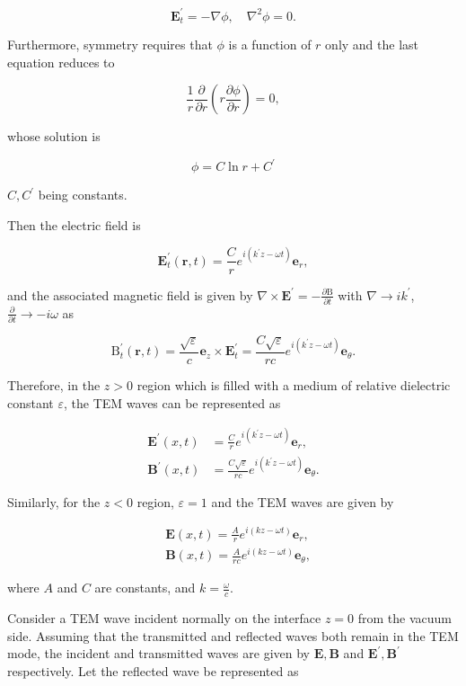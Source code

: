 \documentclass[10pt]{article}
\begin{document}
$$
\mathbf{E}_{t}^{\prime}=-\nabla \phi, \quad \nabla^{2} \phi=0 .
$$

Furthermore, symmetry requires that $\phi$ is a function of $r$ only and the last equation reduces to

$$
\frac{1}{r} \frac{\partial}{\partial r}\left(r \frac{\partial \phi}{\partial r}\right)=0,
$$

whose solution is

$$
\phi=C \ln r+C^{\prime}
$$

$C, C^{\prime}$ being constants.

Then the electric field is

$$
\mathbf{E}_{t}^{\prime}(\mathbf{r}, t)=\frac{C}{r} e^{i\left(k^{\prime} z-\omega t\right)} \mathbf{e}_{r},
$$

and the associated magnetic field is given by $\nabla \times \mathbf{E}^{\prime}=-\frac{\partial \mathrm{B}}{\partial t}$ with $\nabla \rightarrow i k^{\prime}$, $\frac{\partial}{\partial t} \rightarrow-i \omega$ as

$$
\mathrm{B}_{t}^{\prime}(\mathbf{r}, t)=\frac{\sqrt{\varepsilon}}{c} \mathbf{e}_{z} \times \mathbf{E}_{t}^{\prime}=\frac{C \sqrt{\varepsilon}}{r c} e^{i\left(k^{\prime} z-\omega t\right)} \mathbf{e}_{\theta} .
$$

Therefore, in the $z>0$ region which is filled with a medium of relative dielectric constant $\varepsilon$, the TEM waves can be represented as

$$
\begin{aligned}
\mathbf{E}^{\prime}(x, t) &=\frac{C}{r} e^{i\left(k^{\prime} z-\omega t\right)} \mathbf{e}_{r}, \\
\mathbf{B}^{\prime}(x, t) &=\frac{C \sqrt{\varepsilon}}{r c} e^{i\left(k^{\prime} z-\omega t\right)} \mathbf{e}_{\theta} .
\end{aligned}
$$

Similarly, for the $z<0$ region, $\varepsilon=1$ and the TEM waves are given by

$$
\begin{aligned}
&\mathbf{E}(x, t)=\frac{A}{r} e^{i(k z-\omega t)} \mathbf{e}_{r}, \\
&\mathbf{B}(x, t)=\frac{A}{r c} e^{i(k z-\omega t)} \mathbf{e}_{\theta},
\end{aligned}
$$

where $A$ and $C$ are constants, and $k=\frac{\omega}{c}$.

 Consider a TEM wave incident normally on the interface $z=0$ from the vacuum side. Assuming that the transmitted and reflected waves both remain in the TEM mode, the incident and transmitted waves are given by $\mathbf{E}, \mathbf{B}$ and $\mathbf{E}^{\prime}, \mathbf{B}^{\prime}$ respectively. Let the reflected wave be represented as
\end{document}
